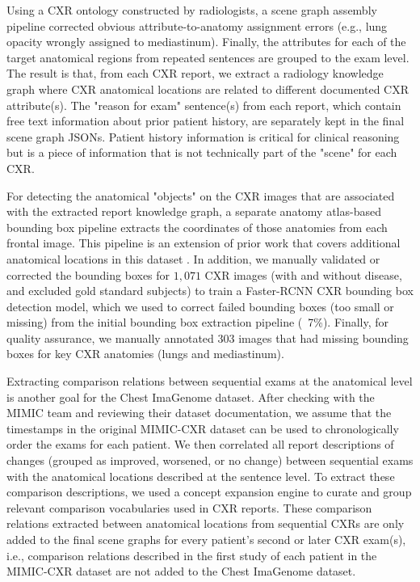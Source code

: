 Using a CXR ontology constructed by radiologists, a scene graph assembly pipeline corrected obvious attribute-to-anatomy assignment errors (e.g., lung opacity wrongly assigned to mediastinum). Finally, the attributes for each of the target anatomical regions from repeated sentences are grouped to the exam level. The result is that, from each CXR report, we extract a radiology knowledge graph where CXR anatomical locations are related to different documented CXR attribute(s). The "reason for exam" sentence(s) from each report, which contain free text information about prior patient history, are separately kept in the final scene graph JSONs. Patient history information is critical for clinical reasoning but is a piece of information that is not technically part of the "scene" for each CXR. 

For detecting the anatomical "objects" on the CXR images that are associated with the extracted report knowledge graph, a separate anatomy atlas-based bounding box pipeline extracts the coordinates of those anatomies from each frontal image. This pipeline is an extension of prior work that covers additional anatomical locations in this dataset \cite{wu2020automatic}. In addition, we manually validated or corrected the bounding boxes for $1,071$ CXR images (with and without disease, and excluded gold standard subjects) to train a Faster-RCNN CXR bounding box detection model, which we used to correct failed bounding boxes (too small or missing) from the initial bounding box extraction pipeline (~7\%). Finally, for quality assurance, we manually annotated $303$ images that had missing bounding boxes for key CXR anatomies (lungs and mediastinum).

Extracting comparison relations between sequential exams at the anatomical level is another goal for the Chest ImaGenome dataset. After checking with the MIMIC team and reviewing their dataset documentation, we assume that the timestamps in the original MIMIC-CXR dataset can be used to chronologically order the exams for each patient. We then correlated all report descriptions of changes (grouped as improved, worsened, or no change) between sequential exams with the anatomical locations described at the sentence level. To extract these comparison descriptions, we used a concept expansion engine \cite{coden2012spot} to curate and group relevant comparison vocabularies used in CXR reports. These comparison relations extracted between anatomical locations from sequential CXRs are only added to the final scene graphs for every patient's second or later CXR exam(s), i.e., comparison relations described in the first study of each patient in the MIMIC-CXR dataset are not added to the Chest ImaGenome dataset.

